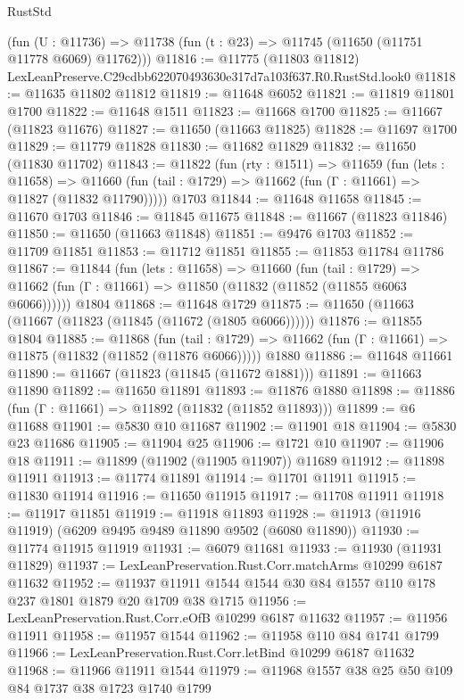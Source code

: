 \begin{lexlean}{RustStd}
\begin{coremodule}
    (fun (U : @11736) => @11738 (fun (t : @23) => @11745 (@11650 (@11751 @11778 @6069) @11762)))
@11816 := @11775 (@11803 @11812) LexLeanPreserve.C29cdbb622070493630e317d7a103f637.R0.RustStd.look0
@11818 := @11635 @11802 @11812
@11819 := @11648 @6052
@11821 := @11819 @11801 @1700
@11822 := @11648 @1511
@11823 := @11668 @1700
@11825 := @11667 (@11823 @11676)
@11827 := @11650 (@11663 @11825)
@11828 := @11697 @1700
@11829 := @11779 @11828
@11830 := @11682 @11829
@11832 := @11650 (@11830 @11702)
@11843 := @11822
    (fun (rty : @1511) =>
    @11659
      (fun (lets : @11658) =>
      @11660 (fun (tail : @1729) => @11662 (fun (Γ : @11661) => @11827 (@11832 @11790)))))
    @1703
@11844 := @11648 @11658
@11845 := @11670 @1703
@11846 := @11845 @11675
@11848 := @11667 (@11823 @11846)
@11850 := @11650 (@11663 @11848)
@11851 := @9476 @1703
@11852 := @11709 @11851
@11853 := @11712 @11851
@11855 := @11853 @11784 @11786
@11867 := @11844
    (fun (lets : @11658) =>
    @11660
      (fun (tail : @1729) =>
      @11662 (fun (Γ : @11661) => @11850 (@11832 (@11852 (@11855 @6063 @6066))))))
    @1804
@11868 := @11648 @1729
@11875 := @11650 (@11663 (@11667 (@11823 (@11845 (@11672 (@1805 @6066))))))
@11876 := @11855 @1804
@11885 := @11868
    (fun (tail : @1729) => @11662 (fun (Γ : @11661) => @11875 (@11832 (@11852 (@11876 @6066)))))
    @1880
@11886 := @11648 @11661
@11890 := @11667 (@11823 (@11845 (@11672 @1881)))
@11891 := @11663 @11890
@11892 := @11650 @11891
@11893 := @11876 @1880
@11898 := @11886 (fun (Γ : @11661) => @11892 (@11832 (@11852 @11893)))
@11899 := @6 @11688
@11901 := @5830 @10 @11687
@11902 := @11901 @18
@11904 := @5830 @23 @11686
@11905 := @11904 @25
@11906 := @1721 @10
@11907 := @11906 @18
@11911 := @11899 (@11902 (@11905 @11907)) @11689
@11912 := @11898 @11911
@11913 := @11774 @11891
@11914 := @11701 @11911
@11915 := @11830 @11914
@11916 := @11650 @11915
@11917 := @11708 @11911
@11918 := @11917 @11851
@11919 := @11918 @11893
@11928 := @11913 (@11916 @11919) (@6209 @9495 @9489 @11890 @9502 (@6080 @11890))
@11930 := @11774 @11915 @11919
@11931 := @6079 @11681
@11933 := @11930 (@11931 @11829)
@11937 := LexLeanPreservation.Rust.Corr.matchArms @10299 @6187 @11632
@11952 := @11937 @11911 @1544 @1544 @30 @84 @1557 @110 @178 @237 @1801 @1879 @20 @1709 @38 @1715
@11956 := LexLeanPreservation.Rust.Corr.eOfB @10299 @6187 @11632
@11957 := @11956 @11911
@11958 := @11957 @1544
@11962 := @11958 @110 @84 @1741 @1799
@11966 := LexLeanPreservation.Rust.Corr.letBind @10299 @6187 @11632
@11968 := @11966 @11911 @1544
@11979 := @11968 @1557 @38 @25 @50 @109 @84 @1737 @38 @1723 @1740 @1799

\end{coremodule}
\end{lexlean}
